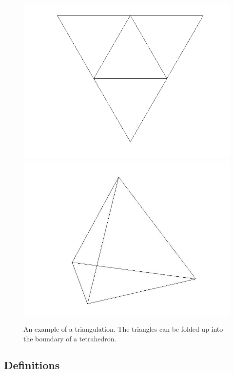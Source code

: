 \documentclass[12pt]{article}
\begin{document}
  
\begin{figure}
\includegraphics[scale = 0.5]{flattetrahedron.png}
\includegraphics[scale = 0.3]{tetrahedron.jpg}
\caption{An example of a triangulation. The triangles can be folded up into the boundary of a tetrahedron.}
\end{figure}

\subsection{Definitions}
\maketitle
\end{document}
